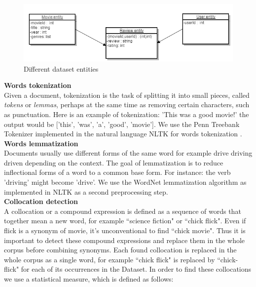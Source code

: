 \documentclass{article}
\begin{document}
\begin{figure}
 \begin{center}
 \includegraphics[scale=0.6]{uml.png} 
 \caption{Different dataset entities} 
  \label{umlDiagram}
  \end{center}
 \end{figure}
\label{subsection:text preprocessing}
\vspace{1.5mm}\noindent \textbf{Words tokenization} \\
Given a document, tokenization is the task of splitting it into  small pieces, called \textit{tokens} or \textit{lemmas}, perhaps at the same time as removing certain characters, such as punctuation. 
Here is an example of tokenization: 'This was a good movie!' the output would be ['this', 'was', 'a', 'good', 'movie'].
We use the Penn Treebank Tokenizer implemented in the  natural language NLTK for words tokenization \cite{nltk:2006, nltk:2009}.\\
\vspace{1.5mm}\noindent \textbf{Words lemmatization}\\
Documents usually use different forms of the same word for example drive driving driven depending on the context.
The goal of lemmatization is to reduce inflectional forms  of a word to a common base form. For instance: the verb 'driving' might become 'drive'. 
We use the WordNet lemmatization algorithm as implemented in NLTK \cite{nltk:2006, nltk:2009} as a second preprocessing step.\\
\vspace{1.5mm}\noindent \textbf{Collocation detection}\\
A collocation or a compound expression is defined as a sequence of words that together mean a new word, for example ``science fiction" or ``chick flick". Even if flick is a synonym of movie, it's unconventional to find ``chick movie".
Thus it is important to detect these compound expressions and replace them in the whole corpus before combining synonyms.
Each found collocation is replaced in the whole corpus as a single word, for example ``chick flick" is replaced by ``chick-flick" for each of its occurrences in the Dataset.
In order to find these collocations we use a statistical measure, which is defined as follows:
\end{document}
